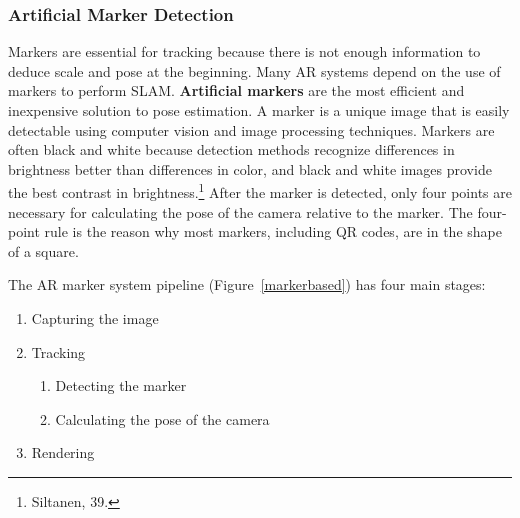 \subsubsection{Artificial Marker Detection}

Markers are essential for tracking because there is not enough information to deduce scale and pose at the beginning. Many AR systems depend on the use of markers to perform SLAM. \textbf{Artificial markers} are the most efficient and inexpensive solution to pose estimation. A marker is a unique image that is easily detectable using computer vision and image processing techniques. Markers are often black and white because detection methods recognize differences in brightness better than differences in color, and black and white images provide the best contrast in brightness.\footnote{Siltanen, 39.} After the marker is detected, only four points are necessary for calculating the pose of the camera relative to the marker. The four-point rule is the reason why most markers, including QR codes, are in the shape of a square.

The AR marker system pipeline (Figure~\ref{markerbased}) has four main stages:
\begin{enumerate}
	\item Capturing the image
	\item Tracking
	\begin{enumerate}
		\item Detecting the marker
		\item Calculating the pose of the camera
	\end{enumerate}
	\item Rendering
\end{enumerate}

\begin{figure}[!ht]
\end{figure}

